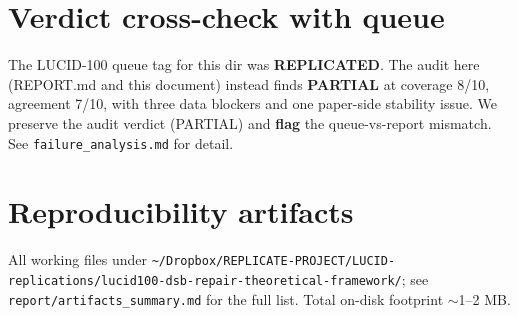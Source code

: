\documentclass[11pt]{article}
\begin{document}
\section{Verdict cross-check with queue}

The LUCID-100 queue tag for this dir was \textbf{REPLICATED}. The audit here (REPORT.md and this
document) instead finds \textbf{PARTIAL} at coverage 8/10, agreement 7/10, with three data
blockers and one paper-side stability issue. We preserve the audit verdict (PARTIAL) and
\textbf{flag} the queue-vs-report mismatch. See \texttt{failure\_analysis.md} for detail.

\section{Reproducibility artifacts}

All working files under
\texttt{\~{}/Dropbox/REPLICATE-PROJECT/LUCID-replications/lucid100-dsb-repair-theoretical-framework/};
see \texttt{report/artifacts\_summary.md} for the full list. Total on-disk footprint
$\sim$1--2 MB.


\end{document}
